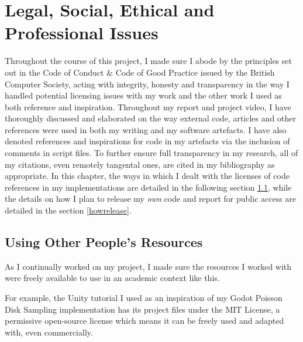 \chapter{Legal, Social, Ethical and Professional Issues} \label{Issues}

Throughout the course of this project, I made sure I abode by the principles set out in the Code of Conduct \& Code of Good Practice issued by the British Computer Society, acting with integrity, honesty and transparency in the way I handled potential licensing issues with my work and the other work I used as both reference and inspiration. Throughout my report and project video, I have thoroughly discussed and elaborated on the way external code, articles and other references were used in both my writing and my software artefacts. I have also denoted references and inspirations for code in my artefacts via the inclusion of comments in script files. To further ensure full transparency in my research, all of my citations, even remotely tangental ones, are cited in my bibliography as appropriate. In this chapter, the ways in which I dealt with the licenses of code references in my implementations are detailed in the following section \ref{howuse}, while the details on how I plan to release my \textit{own} code and report for public access are detailed in the section \ref{howrelease}.  

\section{Using Other People's Resources} \label{howuse}

As I continually worked on my project, I made sure the resources I worked with were freely available to use in an academic context like this.

For example, the Unity tutorial I used as an inspiration of my Godot Poisson Disk Sampling implementation\cite{seblaguetuteYT} has its project files under the MIT License\cite{seblaguetuteGH}, a permissive open-source license which means it can be freely used and adapted with, even commercially.\cite{mitlicense}

